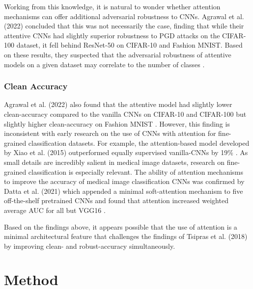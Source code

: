 \documentclass[10pt,twocolumn,letterpaper]{article}
\begin{document}
      Working from this knowledge, it is natural to wonder whether attention mechanisms can offer additional adversarial robustness to CNNs. Agrawal et al. (2022) concluded that this was not necessarily the case, finding that while their attentive CNNs had slightly superior robustness to PGD attacks on the CIFAR-100 dataset, it fell behind ResNet-50 on CIFAR-10 and Fashion MNIST. Based on these results, they suspected that the adversarial robustness of attentive models on a given dataset may correlate to the number of classes \cite{AttentiveCNNRobustness}.
    
    \subsubsection{Clean Accuracy}
      Agrawal et al. (2022) also found that the attentive model had slightly lower clean-accuracy compared to the vanilla CNNs on CIFAR-10 and CIFAR-100 but slightly higher clean-accuracy on Fashion MNIST \cite{AttentiveCNNRobustness}. However, this finding is inconsistent with early research on the use of CNNs with attention for fine-grained classification datasets. For example, the attention-based model developed by Xiao et al. (2015) outperformed equally supervised vanilla-CNNs by 19\% \cite{AttentionForFineGrainedClassification}. As small details are incredibly salient in medical image datasets, research on fine-grained classification is especially relevant. The ability of attention mechanisms to improve the accuracy of medical image classification CNNs was confirmed by Datta et al. (2021) which appended a minimal soft-attention mechanism to five off-the-shelf pretrained CNNs and found that attention increased weighted average AUC for all but VGG16 \cite{AttentionSkinCancerClassification}.

      Based on the findings above, it appears possible that the use of attention is a minimal architectural feature that challenges the findings of Tsipras et al. (2018) \cite{RobustVsAccuracy} by improving clean- and robust-accuracy simultaneously.

  \section{Method}
\end{document}
